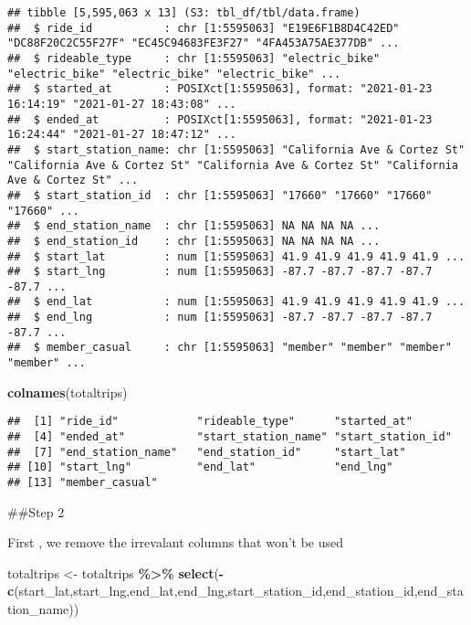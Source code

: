 \documentclass[
]{article}
\newenvironment{Shaded}{\begin{snugshade}}{\end{snugshade}}
\newcommand{\FunctionTok}[1]{\textcolor[rgb]{0.13,0.29,0.53}{\textbf{#1}}}
\newcommand{\NormalTok}[1]{#1}
\newcommand{\OtherTok}[1]{\textcolor[rgb]{0.56,0.35,0.01}{#1}}
\newcommand{\SpecialCharTok}[1]{\textcolor[rgb]{0.81,0.36,0.00}{\textbf{#1}}}
\begin{document}
\begin{verbatim}
## tibble [5,595,063 x 13] (S3: tbl_df/tbl/data.frame)
##  $ ride_id           : chr [1:5595063] "E19E6F1B8D4C42ED" "DC88F20C2C55F27F" "EC45C94683FE3F27" "4FA453A75AE377DB" ...
##  $ rideable_type     : chr [1:5595063] "electric_bike" "electric_bike" "electric_bike" "electric_bike" ...
##  $ started_at        : POSIXct[1:5595063], format: "2021-01-23 16:14:19" "2021-01-27 18:43:08" ...
##  $ ended_at          : POSIXct[1:5595063], format: "2021-01-23 16:24:44" "2021-01-27 18:47:12" ...
##  $ start_station_name: chr [1:5595063] "California Ave & Cortez St" "California Ave & Cortez St" "California Ave & Cortez St" "California Ave & Cortez St" ...
##  $ start_station_id  : chr [1:5595063] "17660" "17660" "17660" "17660" ...
##  $ end_station_name  : chr [1:5595063] NA NA NA NA ...
##  $ end_station_id    : chr [1:5595063] NA NA NA NA ...
##  $ start_lat         : num [1:5595063] 41.9 41.9 41.9 41.9 41.9 ...
##  $ start_lng         : num [1:5595063] -87.7 -87.7 -87.7 -87.7 -87.7 ...
##  $ end_lat           : num [1:5595063] 41.9 41.9 41.9 41.9 41.9 ...
##  $ end_lng           : num [1:5595063] -87.7 -87.7 -87.7 -87.7 -87.7 ...
##  $ member_casual     : chr [1:5595063] "member" "member" "member" "member" ...
\end{verbatim}

\begin{Shaded}
\begin{Highlighting}[]
\FunctionTok{colnames}\NormalTok{(totaltrips)}
\end{Highlighting}
\end{Shaded}

\begin{verbatim}
##  [1] "ride_id"            "rideable_type"      "started_at"        
##  [4] "ended_at"           "start_station_name" "start_station_id"  
##  [7] "end_station_name"   "end_station_id"     "start_lat"         
## [10] "start_lng"          "end_lat"            "end_lng"           
## [13] "member_casual"
\end{verbatim}

\#\#Step 2

First , we remove the irrevalant columns that won't be used

\begin{Shaded}
\begin{Highlighting}[]
\NormalTok{totaltrips }\OtherTok{\textless{}{-}}\NormalTok{ totaltrips }\SpecialCharTok{\%\textgreater{}\%} \FunctionTok{select}\NormalTok{(}\SpecialCharTok{{-}}\FunctionTok{c}\NormalTok{(start\_lat,start\_lng,end\_lat,end\_lng,start\_station\_id,end\_station\_id,end\_station\_name))}
\end{Highlighting}
\end{Shaded}
\end{document}
